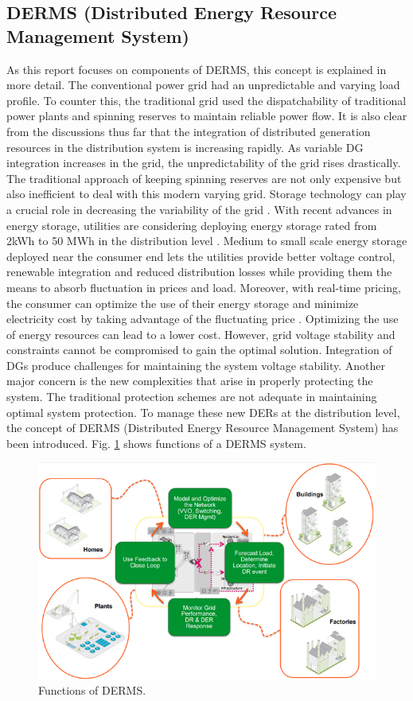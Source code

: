 \subsection{DERMS (Distributed Energy Resource Management System)}
As this report focuses on components of DERMS, this concept is explained in more detail. The conventional power grid had an unpredictable and varying load profile. To counter this, the traditional grid used the dispatchability of traditional power plants and spinning reserves to maintain reliable power flow. It is also clear from the discussions thus far that the integration of distributed generation resources in the distribution system is increasing rapidly. As variable DG integration increases in the grid, the unpredictability of the grid rises drastically. The traditional approach of keeping spinning reserves are not only expensive but also inefficient to deal with this modern varying grid. Storage technology can play a crucial role in decreasing the variability of the grid \cite{USD13}. With recent advances in energy storage, utilities are considering deploying energy storage rated from 2kWh to 50 MWh in the distribution level \cite{Cle12}. Medium to small scale energy storage deployed near the consumer end lets the utilities provide better voltage control, renewable integration and reduced distribution losses while providing them the means to absorb fluctuation in prices and load. Moreover, with real-time pricing, the consumer can optimize the use of their energy storage and minimize electricity cost by taking advantage of the fluctuating price \cite{BPR11,PMv13,ASB17}.
Optimizing the use of energy resources can lead to a lower cost. However, grid voltage stability and constraints cannot be compromised to gain the optimal solution. Integration of DGs produce challenges for maintaining the system voltage stability. Another major concern is the new complexities that arise in properly protecting the system. The traditional protection schemes are not adequate in maintaining optimal system protection. To manage these new DERs at the distribution level, the concept of DERMS (Distributed Energy Resource Management System) has been introduced. Fig. \ref{fig:DERMS_ARCH} shows functions of a DERMS system. 

\begin{figure}[!h]
\centering
\includegraphics[width=0.85\linewidth]{figs/DERMS_ARCH.png}
\caption[Functions of DERMS.]{Functions of DERMS. \cite{DERMS_1}}
\label{fig:DERMS_ARCH}
\end{figure}

